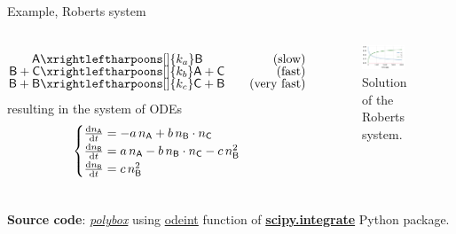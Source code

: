 \begin{frame}{Example, Roberts system}
		\begin{columns}[t]
			   \footnotesize
				\begin{alignat*}{3}
					\mathsf{A} & \xrightleftharpoons[]{k_a} \mathsf{B} & \text{(slow)}\\[-5pt]
					\mathsf{B + C} & \xrightleftharpoons[]{k_b} \mathsf{A + C} & \text{(fast)}\\[-5pt]
					\mathsf{B + B} &\xrightleftharpoons[]{k_c} \mathsf{C + B} & \quad \text{(very fast)}
				\end{alignat*}
				\qquad resulting in the system of ODEs
				$$
				\quad 
				\begin{cases}
					\tfrac{{\rm d} n_\mathsf{A}}{{\rm d} t} = - a\, n_\mathsf{A} + b\, n_\mathsf{B}\cdot n_\mathsf{C}\\
					\tfrac{{\rm d} n_\mathsf{B}}{{\rm d} t} =   a\, n_\mathsf{A}-b\, n_\mathsf{B}\cdot n_\mathsf{C}-c\, n_\mathsf{B}^{2}\\
					\tfrac{{\rm d} n_\mathsf{B}}{{\rm d} t} =   c\, n_\mathsf{B}^{2}
				\end{cases}
				$$
			\vskip -5pt
			\begin{figure}[!h]
				\includegraphics[width=0.75\textwidth]{figures/chemical-kinetics/approximations}
				\caption{\scriptsize Solution of the Roberts system.}
			\end{figure}
		\end{columns}
		\vskip 5pt
		\textbf{Source code}: \href{https://polybox.ethz.ch/index.php/s/vZ54CLT6rooxoJ8}{\textcolor{indigo(dye)}{\it polybox}} using \href{https://docs.scipy.org/doc/scipy/reference/generated/scipy.integrate.odeint.html}{\textcolor{indigo(dye)}{odeint}} function of 
		\href{https://docs.scipy.org/doc/scipy/reference/integrate.html}{\textcolor{indigo(dye)}{\bf scipy.integrate}} Python package.
\end{frame}
%
